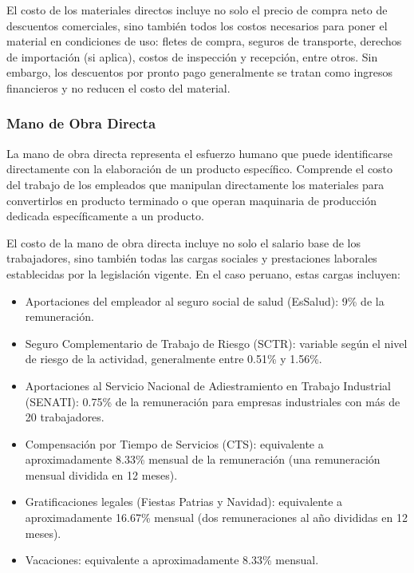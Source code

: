 \documentclass[
  stu,
  floatsintext,
  longtable,
  a4paper,
  nolmodern,
  notxfonts,
  notimes,
  12pt,
  colorlinks=true,linkcolor=blue,citecolor=blue,urlcolor=blue]{apa7}
\providecommand{\tightlist}{%
  \setlength{\itemsep}{0pt}\setlength{\parskip}{0pt}}
\begin{document}
El costo de los materiales directos incluye no solo el precio de compra
neto de descuentos comerciales, sino también todos los costos necesarios
para poner el material en condiciones de uso: fletes de compra, seguros
de transporte, derechos de importación (si aplica), costos de inspección
y recepción, entre otros. Sin embargo, los descuentos por pronto pago
generalmente se tratan como ingresos financieros y no reducen el costo
del material.

\subsubsection{Mano de Obra Directa}\label{mano-de-obra-directa}

La mano de obra directa representa el esfuerzo humano que puede
identificarse directamente con la elaboración de un producto específico.
Comprende el costo del trabajo de los empleados que manipulan
directamente los materiales para convertirlos en producto terminado o
que operan maquinaria de producción dedicada específicamente a un
producto.

El costo de la mano de obra directa incluye no solo el salario base de
los trabajadores, sino también todas las cargas sociales y prestaciones
laborales establecidas por la legislación vigente. En el caso peruano,
estas cargas incluyen:

\begin{itemize}
\tightlist
\item
  Aportaciones del empleador al seguro social de salud (EsSalud): 9\% de
  la remuneración.
\item
  Seguro Complementario de Trabajo de Riesgo (SCTR): variable según el
  nivel de riesgo de la actividad, generalmente entre 0.51\% y 1.56\%.
\item
  Aportaciones al Servicio Nacional de Adiestramiento en Trabajo
  Industrial (SENATI): 0.75\% de la remuneración para empresas
  industriales con más de 20 trabajadores.
\item
  Compensación por Tiempo de Servicios (CTS): equivalente a
  aproximadamente 8.33\% mensual de la remuneración (una remuneración
  mensual dividida en 12 meses).
\item
  Gratificaciones legales (Fiestas Patrias y Navidad): equivalente a
  aproximadamente 16.67\% mensual (dos remuneraciones al año divididas
  en 12 meses).
\item
  Vacaciones: equivalente a aproximadamente 8.33\% mensual.
\end{itemize}
\end{document}
